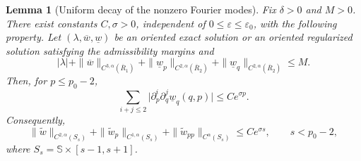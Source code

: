 \documentclass[11pt,reqno]{amsart}
\numberwithin{equation}{section}
\newtheorem{lemma}[theorem]{Lemma}
\theoremstyle{definition}
\theoremstyle{remark}
\begin{document}
\begin{lemma}[Uniform decay of the nonzero Fourier modes]
\label{lem5.2}
Fix $\delta>0$ and $M>0$.  There exist constants $C,\sigma>0$,
independent of $0\leq\varepsilon\leq\varepsilon_0$, with the following
property.  Let $(\lambda,\overline w,\underline w)$ be an oriented exact
solution or an oriented regularized solution satisfying the admissibility
margins and
\[
 |\lambda|+\|\overline w\|_{C^{3,\alpha}(\overline R_1)}
 +\|\underline w_p\|_{C^{2,\alpha}(\overline R_2)}
 +\|\underline w_q\|_{C^{2,\alpha}(\overline R_2)}\le M.
\]
Then, for $p\le p_0-2$,
\begin{equation}\label{eq5dw:wq-tail}
 \sum_{i+j\le2}\bigl|\partial_p^i\partial_q^j\underline w_q(q,p)\bigr|
 \le Ce^{\sigma p}.
\end{equation}
Consequently,
\begin{equation}\label{eq5dw:osc-tail}
 \|\widetilde w\|_{C^{2,\alpha}(S_s)}
 +\|\widetilde w_p\|_{C^{1,\alpha}(S_s)}
 +\|\widetilde w_{pp}\|_{C^{\alpha}(S_s)}
 \le Ce^{\sigma s},\qquad s<p_0-2,
\end{equation}
where $S_s=\mathbb S\times[s-1,s+1]$.
\end{lemma}
\end{document}
